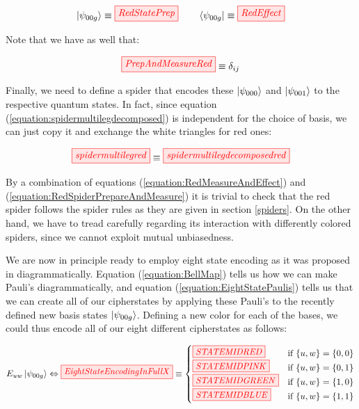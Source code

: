 \documentclass[]{article}
\begin{document}
\begin{equation}
	\ket{\psi_{00g}} \equiv \tikzfig{RedStatePrep} ~~~~~~ \bra{\psi_{00g}} \equiv \tikzfig{RedEffect}
\end{equation}

Note that we have as well that:

\begin{equation}
\label{equation:RedMeasureAndEffect}
\tikzfig{PrepAndMeasureRed} \equiv \delta_{ij}
\end{equation}

Finally, we need to define a spider that encodes these $\ket{\psi_{000}}$ and $\ket{\psi_{001}}$ to the respective quantum states. In fact, since equation (\ref{equation:spidermultilegdecomposed}) is independent for the choice of basis, we can just copy it and exchange the white triangles for red ones:

\begin{equation}
	\label{equation:RedSpiderPrepareAndMeasure}
\tikzfig{spidermultilegred} \equiv \tikzfig{spidermultilegdecomposedred}
\end{equation}

By a combination of equations (\ref{equation:RedMeasureAndEffect}) and (\ref{equation:RedSpiderPrepareAndMeasure}) it is trivial to check that the red spider follows the spider rules as they are given in section \ref{spiders}. On the other hand, we have to tread carefully regarding its interaction with differently colored spiders, since we cannot exploit mutual unbiasedness.

We are now in principle ready to employ eight state encoding as it was proposed in \cite{DeVries2016} diagrammatically. Equation (\ref{equation:BellMap}) tells us how we can make Pauli's diagrammatically, and equation (\ref{equation:EightStatePaulis}) tells us that we can create all of our cipherstates by applying these Pauli's to the recently defined new basis states $\ket{\psi_{00g}}$. Defining a new color for each of the bases, we could thus encode all of our eight different cipherstates as follows:

\begin{equation}
	\label{equation:EightStateEncodingInFull}
	E_{uw}\ket{\psi_{00g}} \Leftrightarrow\tikzfig{EightStateEncodingInFullX} \equiv 
	\begin{cases}
	\tikzfig{STATEMIDRED} & \text{if} ~\{u,w\} = \{0,0\} \\
	\tikzfig{STATEMIDPINK} & \text{if} ~\{u,w\} = \{0,1\} \\
	\tikzfig{STATEMIDGREEN} & \text{if} ~\{u,w\} = \{1,0\} \\
	\tikzfig{STATEMIDBLUE} & \text{if} ~\{u,w\} = \{1,1\} \\
	\end{cases}
\end{equation}
\end{document}
